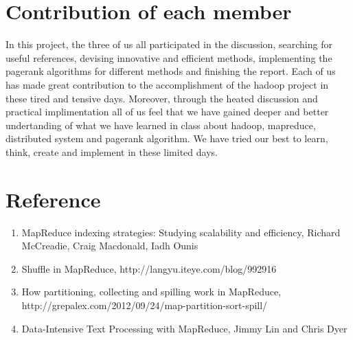 \documentclass[a4paper]{article}
\begin{document}
\section{Contribution of each member}
In this project, the three of us all participated in the discussion, searching for useful references, devising innovative and efficient methods, implementing the pagerank algorithms for different methods and finishing the report. Each of us has made great contribution to the accomplishment of the hadoop project in these tired and tensive days. Moreover, through the heated discussion and practical implimentation all of us feel that we have gained deeper and better undertanding of what we have learned in class about hadoop, mapreduce, distributed system and pagerank algorithm. We have tried our best to learn, think, create and implement in these limited days.
\section{Reference}
\begin{enumerate}
	\item MapReduce indexing strategies: Studying scalability and efficiency, Richard McCreadie, Craig Macdonald, Iadh Ounis\\
	\item Shuffle in MapReduce, http://langyu.iteye.com/blog/992916\\
	\item How partitioning, collecting and spilling work in MapReduce, http://grepalex.com/2012/09/24/map-partition-sort-spill/\\
	\item Data-Intensive Text Processing with MapReduce, Jimmy Lin and Chris Dyer
\end{enumerate}
\end{document}
